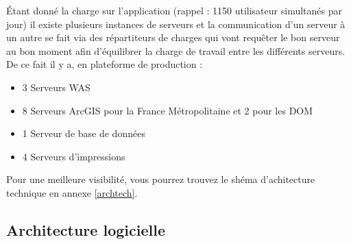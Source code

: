 \'Etant donné la charge sur l'application (rappel : 1150 utilisateur simultanés par jour) il existe plusieurs instances de serveurs et la communication d'un serveur à un autre se fait via des répartiteurs de charges qui vont requêter le bon serveur au bon moment afin d'équilibrer la charge de travail entre les différents serveurs. De ce fait il y a, en plateforme de production :

\begin{itemize}
	\item 3 Serveurs WAS
	\item 8 Serveurs ArcGIS pour la France Métropolitaine et 2 pour les DOM
	\item 1 Serveur de base de données
	\item 4 Serveurs d'impressions\\
\end{itemize}
Pour une meilleure visibilité, vous pourrez trouvez le shéma d'achitecture technique en annexe \ref{archtech}.

\subsection{Architecture logicielle}

